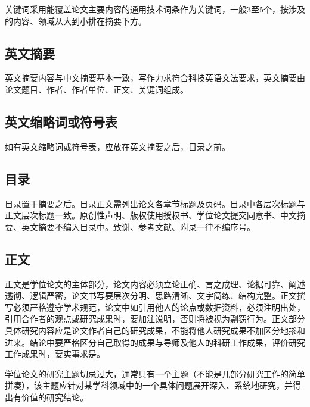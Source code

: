 关键词采用能覆盖论文主要内容的通用技术词条作为关键词，一般3至5个，按涉及的内容、领域从大到小排在摘要下方。

\subsection{英文摘要}

英文摘要内容与中文摘要基本一致，写作力求符合科技英语文法要求，英文摘要由论文题目、作者、作者单位、正文、关键词组成。

\subsection{英文缩略词或符号表}

如有英文缩略词或符号表，应放在英文摘要之后，目录之前。

\subsection{目录}

目录置于摘要之后。目录正文需列出论文各章节标题及页码。目录中各层次标题与正文层次标题一致。原创性声明、版权使用授权书、学位论文提交同意书、中文摘要、英文摘要不编入目录中。致谢、参考文献、附录一律不编序号。

\subsection{正文}

正文是学位论文的主体部分，论文内容必须立论正确、言之成理、论据可靠、阐述透彻、逻辑严密，论文书写要层次分明、思路清晰、文字简练、结构完整。正文撰写必须严格遵守学术规范，论文中如引用他人的论点或数据资料，必须注明出处，引用合作者的观点或研究成果时，要加注说明，否则将被视为剽窃行为。正文部分具体研究内容应是论文作者自己的研究成果，不能将他人研究成果不加区分地掺和进来。结论中要严格区分自己取得的成果与导师及他人的科研工作成果，评价研究工作成果时，要实事求是。

学位论文的研究主题切忌过大，通常只有一个主题（不能是几部分研究工作的简单拼凑），该主题应针对某学科领域中的一个具体问题展开深入、系统地研究，并得出有价值的研究结论。

